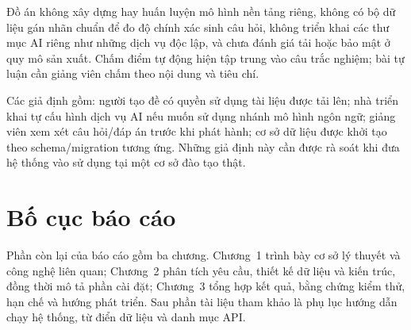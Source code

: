 Đồ án không xây dựng hay huấn luyện mô hình nền tảng riêng, không có bộ dữ
liệu gán nhãn chuẩn để đo độ chính xác sinh câu hỏi, không triển khai các
thư mục AI riêng như những dịch vụ độc lập, và chưa đánh giá tải hoặc bảo
mật ở quy mô sản xuất. Chấm điểm tự động hiện tập trung vào câu trắc nghiệm;
bài tự luận cần giảng viên chấm theo nội dung và tiêu chí.

Các giả định gồm: người tạo đề có quyền sử dụng tài liệu được tải lên; nhà
triển khai tự cấu hình dịch vụ AI nếu muốn sử dụng nhánh mô hình ngôn ngữ;
giảng viên xem xét câu hỏi/đáp án trước khi phát hành; cơ sở dữ liệu được
khởi tạo theo schema/migration tương ứng. Những giả định này cần được rà
soát khi đưa hệ thống vào sử dụng tại một cơ sở đào tạo thật.

\section{Bố cục báo cáo}

Phần còn lại của báo cáo gồm ba chương. Chương~1 trình bày cơ sở lý thuyết
và công nghệ liên quan; Chương~2 phân tích yêu cầu, thiết kế dữ liệu và
kiến trúc, đồng thời mô tả phần cài đặt; Chương~3 tổng hợp kết quả, bằng
chứng kiểm thử, hạn chế và hướng phát triển. Sau phần tài liệu tham khảo là
phụ lục hướng dẫn chạy hệ thống, từ điển dữ liệu và danh mục API.
